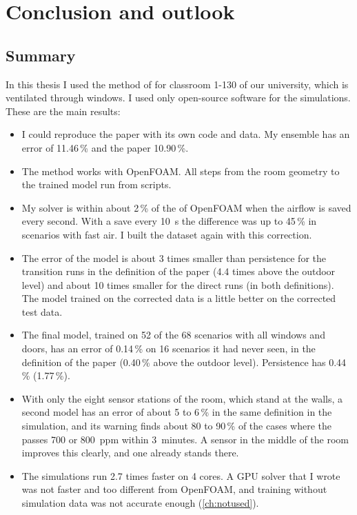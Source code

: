 \chapter{Conclusion and outlook}
\label{ch:conclusion}

\section{Summary}
In this thesis I used the method of \citet{bian2025} for classroom 1-130 of our university, which is
ventilated through windows. I used only open-source software for the simulations. These are the main results:
\begin{itemize}
  \item I could reproduce the paper with its own code and data. My ensemble has an error of 11.46\,\% and the
        paper 10.90\,\%.
  \item The method works with OpenFOAM. All steps from the room geometry to the trained model run from
        scripts.
  \item My \cotwo{} solver is within about 2\,\% of the \cotwo{} of OpenFOAM when the airflow is saved every
        second. With a save every 10~s the difference was up to 45\,\% in scenarios with fast air. I built
        the dataset again with this correction.
  \item The error of the model is about 3 times smaller than persistence for the transition runs in the
        definition of the paper (4.4 times above the outdoor level) and about 10 times smaller for the direct
        runs (in both definitions). The model trained on the corrected data is a little better on the
        corrected test data.
  \item The final model, trained on 52 of the 68 scenarios with all windows and doors, has an error of 0.14\,\%
        on 16 scenarios it had never seen, in the definition of the paper (0.40\,\% above the outdoor level).
        Persistence has 0.44\,\% (1.77\,\%).
  \item With only the eight sensor stations of the room, which stand at the walls, a second model has an error of
        about 5 to 6\,\% in the same definition in the simulation, and its warning finds about 80 to 90\,\% of the
        cases where the \cotwo{} passes 700 or 800~ppm within 3~minutes. A sensor in the middle of the room
        improves this clearly, and one already stands there.
  \item The simulations run 2.7 times faster on 4 cores. A GPU solver that I wrote was not faster and too
        different from OpenFOAM, and training without simulation data was not accurate enough
        (\cref{ch:notused}).
\end{itemize}

